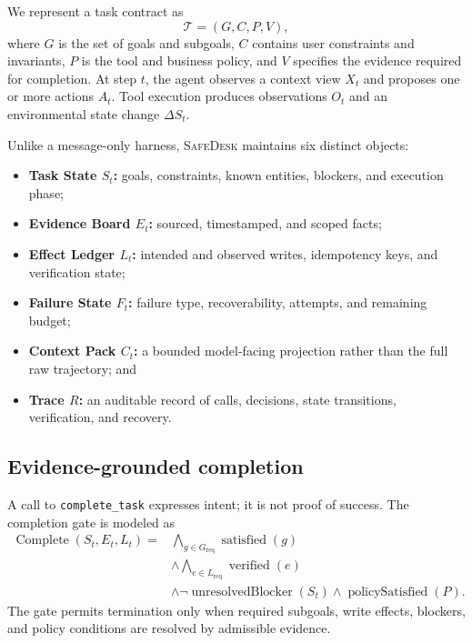 \documentclass[10pt]{article}
\newcommand{\safedesk}{\textsc{SafeDesk}}
\begin{document}
We represent a task contract as
\begin{equation}
  \mathcal{T} = (G, C, P, V),
\end{equation}
where $G$ is the set of goals and subgoals, $C$ contains user constraints and
invariants, $P$ is the tool and business policy, and $V$ specifies the evidence
required for completion. At step $t$, the agent observes a context view $X_t$ and
proposes one or more actions $A_t$. Tool execution produces observations $O_t$
and an environmental state change $\Delta S_t$.

Unlike a message-only harness, \safedesk{} maintains six distinct objects:
\begin{itemize}[leftmargin=*,itemsep=1pt]
  \item \textbf{Task State $S_t$:} goals, constraints, known entities, blockers,
        and execution phase;
  \item \textbf{Evidence Board $E_t$:} sourced, timestamped, and scoped facts;
  \item \textbf{Effect Ledger $L_t$:} intended and observed writes, idempotency
        keys, and verification state;
  \item \textbf{Failure State $F_t$:} failure type, recoverability, attempts, and
        remaining budget;
  \item \textbf{Context Pack $C_t$:} a bounded model-facing projection rather
        than the full raw trajectory; and
  \item \textbf{Trace $R$:} an auditable record of calls, decisions, state
        transitions, verification, and recovery.
\end{itemize}

\subsection{Evidence-grounded completion}

A call to \texttt{complete\_task} expresses intent; it is not proof of success.
The completion gate is modeled as
\begin{align}
\operatorname{Complete}(S_t,E_t,L_t) =
  &\bigwedge_{g \in G_{\mathrm{req}}} \operatorname{satisfied}(g) \nonumber\\
  &\land \bigwedge_{e \in L_{\mathrm{req}}} \operatorname{verified}(e) \nonumber\\
  &\land \neg\operatorname{unresolvedBlocker}(S_t)
   \land \operatorname{policySatisfied}(P).
\end{align}
The gate permits termination only when required subgoals, write effects, blockers,
and policy conditions are resolved by admissible evidence.
\end{document}
